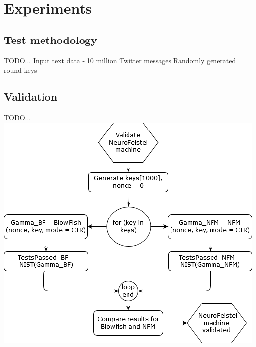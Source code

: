\documentclass{article}
\begin{document}
\section{Experiments}
\subsection{Test methodology}
TODO...
Input text data - 10 million Twitter messages
Randomly generated round keys

\subsection{Validation}
TODO...
\includegraphics[scale=1]{img/NFM_validation.png}
\end{document}
